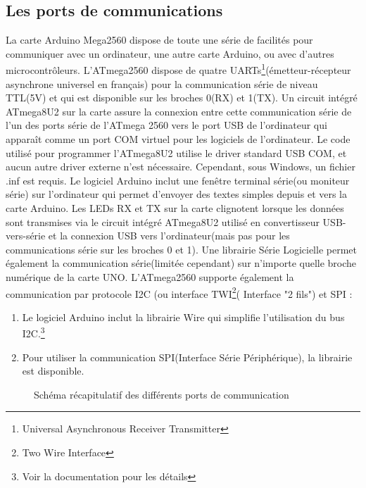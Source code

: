 \documentclass[12pt, openany]{report}
\begin{document}
         		 \subsection{Les ports de communications}
         		 La carte Arduino Mega2560 dispose de toute une série de facilités pour communiquer avec un ordinateur, une autre carte Arduino, ou avec d'autres microcontrôleurs. L'ATmega2560 dispose de quatre UARTs\footnote{Universal Asynchronous Receiver Transmitter}(émetteur-récepteur asynchrone universel en français) pour la communication série de niveau TTL(5V) et qui est disponible sur les broches 0(RX) et 1(TX). Un circuit intégré ATmega8U2 sur la carte assure la connexion entre cette communication série de l'un des ports série de l'ATmega 2560 vers le port USB de l'ordinateur qui apparaît comme un port COM virtuel pour les logiciels de l'ordinateur. Le code utilisé pour programmer l'ATmega8U2 utilise le driver standard USB COM, et aucun autre driver externe n'est nécessaire. Cependant, sous Windows, un fichier .inf est requis.
         		 Le logiciel Arduino inclut une fenêtre terminal série(ou moniteur série) sur l'ordinateur qui permet d'envoyer des textes simples depuis et vers la carte Arduino. Les LEDs RX et TX sur la carte clignotent lorsque les données sont transmises via le circuit intégré ATmega8U2 utilisé en convertisseur USB-vers-série et la connexion USB vers l'ordinateur(mais pas pour les communications série sur les broches 0 et 1).
         		 Une librairie Série Logicielle permet également la communication série(limitée cependant) sur n'importe quelle broche numérique de la carte UNO.
         		 L'ATmega2560 supporte également la communication par protocole I2C (ou interface TWI\footnote{Two Wire Interface}( Interface "2 fils") et SPI :
         		 \begin{enumerate}
         		 \item Le logiciel Arduino inclut la librairie Wire qui simplifie l'utilisation du bus I2C.\footnote{Voir la documentation pour les détails}
         		 \item Pour utiliser la communication SPI(Interface Série Périphérique), la librairie est disponible.
         		
         		 \end{enumerate}
         \begin{figure}[!h  ]
          \centering

  \caption{Schéma récapitulatif des différents ports de communication}
         		          		
 \end{figure}
 \newpage
         		
\end{document}
